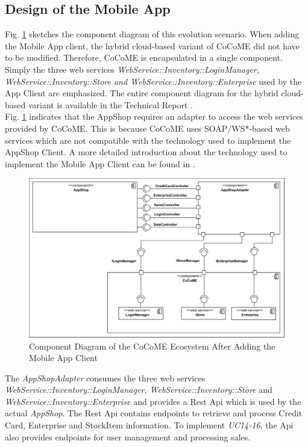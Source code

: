 \subsection{Design of the Mobile App}\label{DesignMobileApp}
 Fig. \ref{ComponentApp} sketches the component diagram of this evolution scenario. When adding the Mobile App client, the hybrid cloud-based variant of CoCoME did not have to be modified. Therefore, CoCoME is encapsulated in a single component. Simply the three web services \textit{WebService::Inventory::LoginManager, WebService::Inventory::Store and WebService::Inventory::Enterprise} used by the App Client are emphasized. The entire component diagram for the hybrid cloud-based variant is available in the Technical Report \cite{HeinrichRostamiReussner2016_1000052688}. 
 \\ Fig. \ref{ComponentApp} indicates that the AppShop requires an adapter to access the web services provided by CoCoME. This is because CoCoME uses SOAP/WS*-based web services which are not compatible with the technology used to implement the AppShop Client. A more detailed introduction about the technology used to implement the Mobile App Client can be found in \cite{schnabel}. 
  
 \begin{figure}[!h]
	\includegraphics[width=\textwidth]{img/appComponent.png}
	\caption{Component Diagram of the CoCoME Ecosystem After Adding the Mobile App Client}
	\label{ComponentApp}
\end{figure}
\noindent
  The \textit{AppShopAdapter} consumes the three web services \textit{WebService::Inventory::LoginManager, WebService::Inventory::Store} and \textit{WebService::Inventory::Enterprise} and provides a Rest Api which is used by the actual \textit{AppShop}. The Rest Api contains endpoints to retrieve and process Credit Card, Enterprise and StockItem information. To implement \emph{UC14-16}, the Api also provides endpoints for user management and processing sales. 
  
